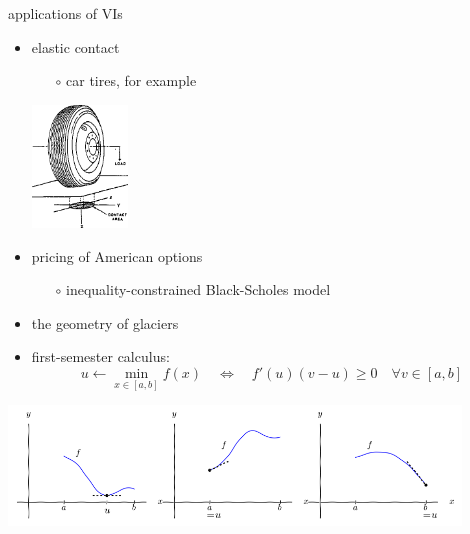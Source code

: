 \documentclass[svgnames,
               hyperref={colorlinks,citecolor=DeepPink4,linkcolor=FireBrick,urlcolor=Maroon},
               usepdftitle=false]  %
               {beamer}
\begin{document}
\begin{frame}{applications of VIs}

\begin{itemize}
\item elastic contact
    \begin{itemize}
    \item[$\circ$] car tires, for example
    \end{itemize}

\vspace{-10mm}
\hfill \includegraphics[width=0.2\textwidth]{figs/tirecontact.png}

\vspace{-20mm}
\item pricing of American options
    \begin{itemize}
    \item[$\circ$] inequality-constrained Black-Scholes model
    \end{itemize}

\vspace{1.5mm}
\item the geometry of glaciers %

\vspace{3mm}
\item first-semester calculus:
    $$u \gets \min_{x\in[a,b]} f(x) \quad \iff \quad f'(u)(v-u) \ge 0 \quad \forall v \in[a,b]$$
\end{itemize}

\begin{center}
\includegraphics[width=0.9\textwidth]{../talk-oxford/images/calcone.png}
\end{center}
\end{frame}
\end{document}
